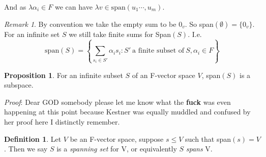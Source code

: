 \documentclass{report}
\theoremstyle{remark}
\newtheorem{remark}[theorem]{Remark}
\theoremstyle{definition}
\newtheorem{definition}[theorem]{Definition}
\theoremstyle{definition}
\theoremstyle{theorem}
\newtheorem{proposition}[theorem]{Proposition}
\begin{document}
And as $\lambda \alpha_i \in F$ we can have $\lambda v \in \text{span}(u_1 \cdots, u_m)$.
\begin{remark}
By convention we take the empty sum to be $0_v$. So span$(\emptyset) = \{0_v\}$. For an infinite set $S$ we still take finite sums for Span$(S)$. I.e.
\[ \text{span}(S) = \left\{ \sum_{s_i \in S'} \alpha_is_i: S' \> \text{a finite subset of} \> S, \alpha_i \in F \right\} \]
\end{remark}
\begin{proposition}
For an infinite subset $S$ of an F-vector space $V$, span$(S)$ is a subspace.
\end{proposition}
\emph{Proof}: Dear GOD somebody please let me know what the \textbf{fuck} was even happening at this point because Kestner was equally muddled and confused by her proof here I distinctly remember.
\begin{definition}
Let $V$ be an F-vector space, suppose $s \leq V$ such that span$(s) = V$. Then we say $S$ is a \emph{spanning set} for V, or equivalently $S$ \emph{spans} V.
\end{definition}
\end{document}
